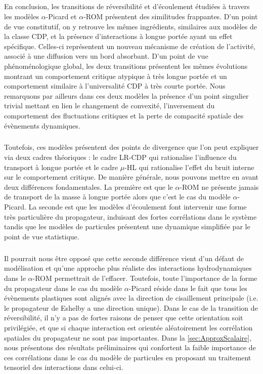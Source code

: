 \subparagraph{}En conclusion, les transitions de réversibilité et d'écoulement étudiées à travers les modèles $\alpha$-Picard et $\alpha$-ROM présentent des similitudes frappantes. D'un point de vue constitutif, on y retrouve les mêmes ingrédients, similaires aux modèles de la classe CDP, et la présence d'interactions à longue portée ayant un effet spécifique. Celles-ci représentent un nouveau mécanisme de création de l'activité, associé à une diffusion vers un bord absorbant. D'un point de vue phénoménologique global, les deux transitions présentent les mêmes évolutions montrant un comportement critique atypique à très longue portée et un comportement similaire à l'universalité CDP à très courte portée. Nous remarquons par ailleurs dans ces deux modèles la présence d'un point singulier trivial mettant en lien le changement de convexité, l'inversement du comportement des fluctuations critiques et la perte de compacité spatiale des évènements dynamiques.


\subparagraph{}Toutefois, ces modèles présentent des points de divergence que l'on peut expliquer via deux cadres théoriques : le cadre LR-CDP qui rationalise l'influence du transport à longue portée et le cadre $\mu$-HL qui rationalise l'effet du bruit interne sur le comportement critique. De manière générale, nous pouvons mettre en avant deux différences fondamentales. La première est que le $\alpha$-ROM ne présente jamais de transport de la masse à longue portée alors que c'est le cas du modèle $\alpha$-Picard. La seconde est que les modèles d'écoulement font intervenir une forme très particulière du propagateur, induisant des fortes corrélations dans le système tandis que les modèles de particules présentent une dynamique simplifiée par le point de vue statistique.

\subparagraph{}Il pourrait nous être opposé que cette seconde différence vient d'un défaut de modélisation et qu'une approche plus réaliste des interactions hydrodynamiques dans le $\alpha$-ROM permettrait de l'effacer. Toutefois, toute l'importance de la forme du propagateur dans le cas du modèle $\alpha$-Picard réside dans le fait que tous les évènements plastiques sont alignés avec la direction de cisaillement principale (i.e. le propagateur de Eshelby a une direction unique). Dans le cas de la transition de réversibilité, il n'y a pas de fortes raisons de penser que cette orientation soit privilégiée, et que si chaque interaction est orientée aléatoirement les corrélation spatiales du propagateur ne sont pas importantes. Dans la \autoref{sec:ApproxScalaire}, nous présentons des résultats préliminaires qui confortent la faible importance de ces corrélations dans le cas du modèle de particules en proposant un traitement tensoriel des interactions dans celui-ci.

